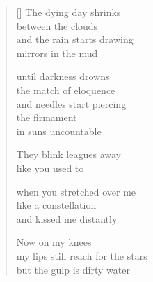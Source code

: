 \documentclass[12pt,a4paper]{article}
\begin{document}
\begin{verse}[\versewidth]
  The dying day shrinks \\
  between the clouds \\
  and the rain starts drawing \\
  mirrors in the mud

  until darkness drowns \\
  the match of eloquence \\
  and needles start piercing \\
  the firmament \\
  in suns uncountable

  They blink leagues away \\
  like you used to

  when you stretched over me \\
  like a constellation \\
  and kissed me distantly

  Now on my knees \\
  my lips still reach for the stars \\
  but the gulp is dirty water
\end{verse}


\newpage

\poemtitle{}

\settowidth{\versewidth}{like those of a silent film actor}

\bigskip
\end{document}

